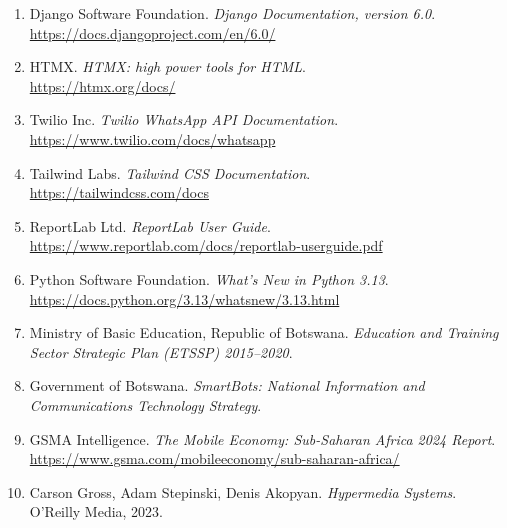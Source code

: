 \documentclass[11pt,a4paper]{article}
\begin{document}
\begin{enumerate}[leftmargin=*]
    \item Django Software Foundation. \textit{Django Documentation, version 6.0}.\\
          \url{https://docs.djangoproject.com/en/6.0/}

    \item HTMX. \textit{HTMX: high power tools for HTML}.\\
          \url{https://htmx.org/docs/}

    \item Twilio Inc. \textit{Twilio WhatsApp API Documentation}.\\
          \url{https://www.twilio.com/docs/whatsapp}

    \item Tailwind Labs. \textit{Tailwind CSS Documentation}.\\
          \url{https://tailwindcss.com/docs}

    \item ReportLab Ltd. \textit{ReportLab User Guide}.\\
          \url{https://www.reportlab.com/docs/reportlab-userguide.pdf}

    \item Python Software Foundation. \textit{What's New in Python 3.13}.\\
          \url{https://docs.python.org/3.13/whatsnew/3.13.html}

    \item Ministry of Basic Education, Republic of Botswana.
          \textit{Education and Training Sector Strategic Plan
          (ETSSP) 2015--2020}.

    \item Government of Botswana. \textit{SmartBots: National
          Information and Communications Technology Strategy}.

    \item GSMA Intelligence. \textit{The Mobile Economy: Sub-Saharan
          Africa 2024 Report}.\\
          \url{https://www.gsma.com/mobileeconomy/sub-saharan-africa/}

    \item Carson Gross, Adam Stepinski, Denis Akopyan.
          \textit{Hypermedia Systems}.
          O'Reilly Media, 2023.
\end{enumerate}

\appendix
\end{document}
